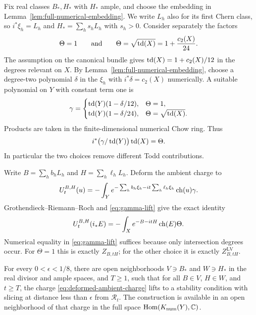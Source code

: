 Fix real classes $B_*,H_*$ with $H_*$ ample, and choose the embedding in
Lemma~\ref{lem:full-numerical-embedding}.  We write $L_h$ also for its first
Chern class, so $i^*\xi_h=L_h$ and $H_*=\sum_hs_hL_h$ with $s_h>0$.
Consider separately the factors
\begin{equation}\label{eq:two-character-factors}
 \Theta=1\qquad\text{and}\qquad
 \Theta=\sqrt{\operatorname{td}(X)}=1+\frac{c_2(X)}{24}.
\end{equation}
The assumption on the canonical bundle gives
$\operatorname{td}(X)=1+c_2(X)/12$ in the degrees relevant on $X$.  By
Lemma~\ref{lem:full-numerical-embedding}, choose a degree-two polynomial
$\delta$ in the $\xi_h$ with $i^*\delta=c_2(X)$ numerically.  A suitable
polynomial on $Y$ with constant term one is
\[
 \gamma=\begin{cases}
 \operatorname{td}(Y)(1-\delta/12),&\Theta=1,\\
 \operatorname{td}(Y)(1-\delta/24),&\Theta=\sqrt{\operatorname{td}(X)}.
 \end{cases}
\]
Products are taken in the finite-dimensional numerical Chow ring.  Thus
\begin{equation}\label{eq:gamma-lift}
 i^*\bigl(\gamma/\operatorname{td}(Y)\bigr)\operatorname{td}(X)=\Theta.
\end{equation}
In particular the two choices remove different Todd contributions.

Write $B=\sum_hb_hL_h$ and $H=\sum_h\ell_hL_h$.  Deform the ambient charge
to
\begin{equation}\label{eq:deformed-ambient-charge}
 U_t^{B,H}(u)=-\int_Y
 e^{-\sum_hb_h\xi_h-it\sum_h\ell_h\xi_h}\operatorname{ch}(u)\gamma.
\end{equation}
Grothendieck--Riemann--Roch and \eqref{eq:gamma-lift} give the exact identity
\begin{equation}\label{eq:exact-restricted-charge}
 U_t^{B,H}(i_*E)=-\int_Xe^{-B-itH}\operatorname{ch}(E)\Theta.
\end{equation}
Numerical equality in \eqref{eq:gamma-lift} suffices because only
intersection degrees occur.  For $\Theta=1$ this is exactly $Z_{B,tH}$;
for the other choice it is exactly $Z^{\mathrm{LV}}_{B,tH}$.

\begin{lemma}\label{lem:uniform-ambient-deformation}
For every $0<\epsilon<1/8$, there are open neighborhoods $V\ni B_*$ and
$W\ni H_*$ in the real divisor and ample spaces, and $T\ge1$, such that for all
$B\in V$, $H\in W$, and $t\ge T$, the charge
\eqref{eq:deformed-ambient-charge} lifts to a stability condition with
slicing at distance less than $\epsilon$ from
$\mathcal R_t$.  The construction is available in an open neighborhood of
that charge in the full space $\operatorname{Hom}(K_{\mathrm{num}}(Y),\mathbb C)$.
\end{lemma}

